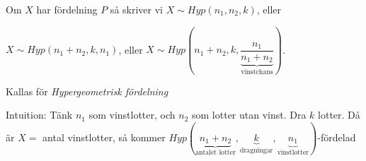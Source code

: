 \par\bigskip
\noindent Om $X$ har fördelning $P$ så skriver vi $X\sim Hyp(n_1,n_2,k)$, eller\par\noindent $X\sim Hyp(n_1+n_2,k,n_1)$, eller $X\sim Hyp(n_1+n_2,k,\underbrace{\dfrac{n_1}{n_1+n_2}}_{\text{vinstchans}})$.\par
\noindent Kallas för \textit{Hypergeometrisk fördelning}
\par\bigskip
\noindent Intuition: Tänk $n_1$ som vinstlotter, och $n_2$ som lotter utan vinst. Dra $k$ lotter. Då är $X =$ antal vinstlotter, så kommer $Hyp(\underbrace{n_1+n_2}_{\text{antalet lotter}},\underbrace{k}_{\text{dragningar}},\underbrace{n_1}_{\text{vinstlotter}})$-fördelad
